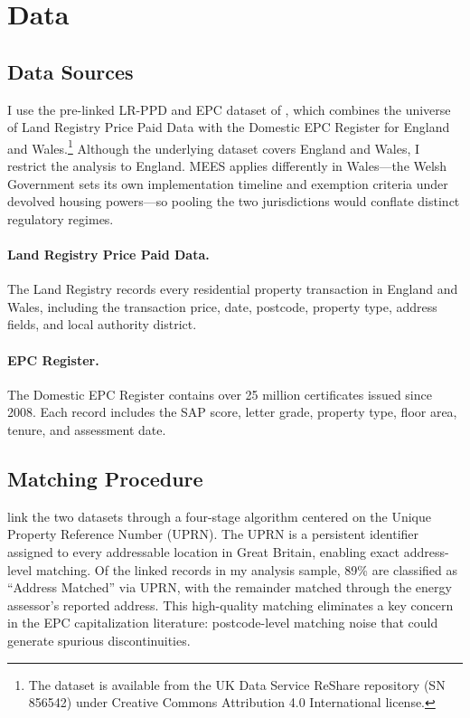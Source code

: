 \documentclass[12pt]{article}
\begin{document}
\section{Data}\label{sec:data}

\subsection{Data Sources}

I use the pre-linked LR-PPD and EPC dataset of \citet{chi2023linked}, which combines the universe of Land Registry Price Paid Data with the Domestic EPC Register for England and Wales.\footnote{The dataset is available from the UK Data Service ReShare repository (SN 856542) under Creative Commons Attribution 4.0 International license.} Although the underlying dataset covers England and Wales, I restrict the analysis to England. MEES applies differently in Wales---the Welsh Government sets its own implementation timeline and exemption criteria under devolved housing powers---so pooling the two jurisdictions would conflate distinct regulatory regimes.

\paragraph{Land Registry Price Paid Data.} The Land Registry records every residential property transaction in England and Wales, including the transaction price, date, postcode, property type, address fields, and local authority district.

\paragraph{EPC Register.} The Domestic EPC Register contains over 25 million certificates issued since 2008. Each record includes the SAP score, letter grade, property type, floor area, tenure, and assessment date.

\subsection{Matching Procedure}

\citet{chi2023linked} link the two datasets through a four-stage algorithm centered on the Unique Property Reference Number (UPRN). The UPRN is a persistent identifier assigned to every addressable location in Great Britain, enabling exact address-level matching. Of the linked records in my analysis sample, 89\% are classified as ``Address Matched'' via UPRN, with the remainder matched through the energy assessor's reported address. This high-quality matching eliminates a key concern in the EPC capitalization literature: postcode-level matching noise that could generate spurious discontinuities.
\end{document}
